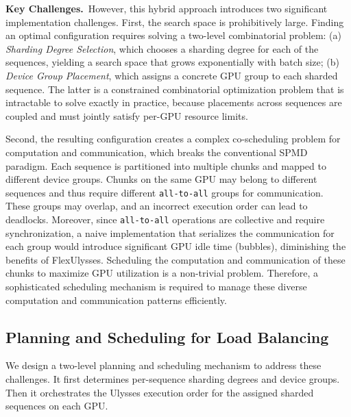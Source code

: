 \noindent\textbf{Key Challenges.}~However, this hybrid approach introduces two significant implementation challenges. First, the search space is prohibitively large. Finding an optimal configuration requires solving a two-level combinatorial problem: (a) \textit{Sharding Degree Selection}, which chooses a sharding degree for each of the sequences, yielding a search space that grows exponentially with batch size; (b) \textit{Device Group Placement}, which assigns a concrete GPU group to each sharded sequence. The latter is a constrained combinatorial optimization problem that is intractable to solve exactly in practice, because placements across sequences are coupled and must jointly satisfy per-GPU resource limits. 

Second, the resulting configuration creates a complex co-scheduling problem for computation and communication, which breaks the conventional SPMD paradigm. Each sequence is partitioned into multiple chunks and mapped to different device groups. Chunks on the same GPU may belong to different sequences and thus require different \texttt{all-to-all} groups for communication. These groups may overlap, and an incorrect execution order can lead to deadlocks. Moreover, since \texttt{all-to-all} operations are collective and require synchronization, a naive implementation that serializes the communication for each group would introduce significant GPU idle time (bubbles), diminishing the benefits of FlexUlysses. Scheduling the computation and communication of these chunks to maximize GPU utilization is a non-trivial problem. Therefore, a sophisticated scheduling mechanism is required to manage these diverse computation and communication patterns efficiently.

\subsection{Planning and Scheduling for Load Balancing}

We design a two-level planning and scheduling mechanism to address these challenges. It first determines per-sequence sharding degrees and device groups. Then it orchestrates the Ulysses execution order for the assigned sharded sequences on each GPU. %

